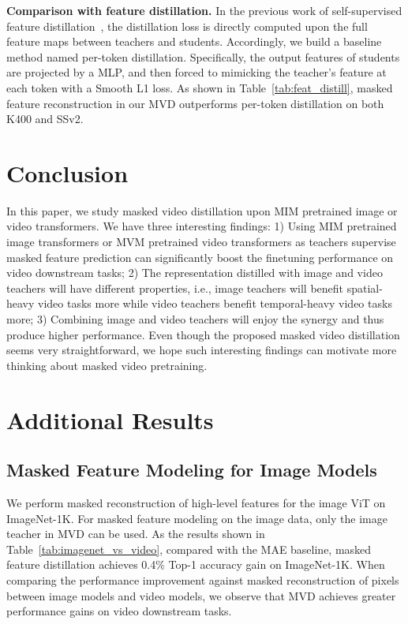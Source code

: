 \documentclass[10pt,twocolumn,letterpaper]{article}
\begin{document}
\vspace{0.05in}
\noindent \textbf{Comparison with feature distillation.} In the previous work of self-supervised feature distillation~\cite{fang2021seed,gou2021knowledge,xu2021bag}, the distillation loss is directly computed upon the full feature maps between teachers and students. Accordingly, we build a baseline method named per-token distillation. Specifically, the output features of students are projected by a MLP, and then forced to mimicking the teacher's feature at each token with a Smooth L1 loss. As shown in Table~\ref{tab:feat_distill}, masked feature reconstruction in our MVD outperforms per-token distillation on both K400 and SSv2.

\section{Conclusion}
In this paper, we study masked video distillation upon MIM pretrained image or video transformers. We have three interesting findings: 1) Using MIM pretrained image transformers or MVM pretrained video transformers as teachers supervise masked feature prediction can significantly boost the finetuning performance on video downstream tasks; 2) The representation distilled with image and video teachers will have different properties, i.e., image teachers will benefit spatial-heavy video tasks more while video teachers benefit temporal-heavy video tasks more; 3) Combining image and video teachers will enjoy the synergy and thus produce higher performance. Even though the proposed masked video distillation seems very straightforward, we hope such interesting findings can motivate more thinking about masked video pretraining.

{\small


}

\clearpage
\newpage
\appendix


\section{Additional Results}


\subsection{Masked Feature Modeling for Image Models}

We perform masked reconstruction of high-level features for the image ViT on ImageNet-1K. For masked feature modeling on the image data, only the image teacher in MVD can be used. As the results shown in Table~\ref{tab:imagenet_vs_video}, compared with the MAE baseline, masked feature distillation achieves 0.4\% Top-1 accuracy gain on ImageNet-1K. When comparing the performance improvement against masked reconstruction of pixels between image models and video models, we observe that MVD achieves greater performance gains on video downstream tasks.  
\end{document}
